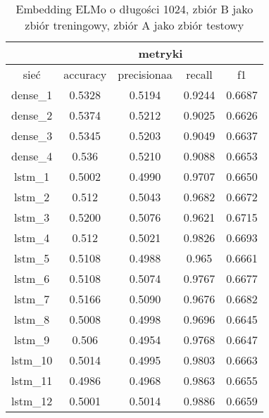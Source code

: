 \begin{table}[] \centering
    \caption{Embedding ELMo o długości 1024, zbiór B jako zbiór treningowy, zbiór A jako zbiór testowy }
    \label{tab:wyniki_1024_eks2}
    \begin{tabular}{|c|c|c|c|c|}
        \hline
                 & \multicolumn{4}{c|}{metryki}                                 \\ \hline
        sieć     & accuracy                     & precisionaa & recall & f1     \\ \hline
        dense\_1 & 0.5328                       & 0.5194      & 0.9244 & 0.6687 \\ \hline
        dense\_2 & 0.5374                       & 0.5212      & 0.9025 & 0.6626 \\ \hline
        dense\_3 & 0.5345                       & 0.5203      & 0.9049 & 0.6637 \\ \hline
        dense\_4 & 0.536                        & 0.5210      & 0.9088 & 0.6653 \\ \hline
        lstm\_1  & 0.5002                       & 0.4990      & 0.9707 & 0.6650 \\ \hline
        lstm\_2  & 0.512                        & 0.5043      & 0.9682 & 0.6672 \\ \hline
        lstm\_3  & 0.5200                       & 0.5076      & 0.9621 & 0.6715 \\ \hline
        lstm\_4  & 0.512                        & 0.5021      & 0.9826 & 0.6693 \\ \hline
        lstm\_5  & 0.5108                       & 0.4988      & 0.965  & 0.6661 \\ \hline
        lstm\_6  & 0.5108                       & 0.5074      & 0.9767 & 0.6677 \\ \hline
        lstm\_7  & 0.5166                       & 0.5090      & 0.9676 & 0.6682 \\ \hline
        lstm\_8  & 0.5008                       & 0.4998      & 0.9696 & 0.6645 \\ \hline
        lstm\_9  & 0.506                        & 0.4954      & 0.9768 & 0.6647 \\ \hline
        lstm\_10 & 0.5014                       & 0.4995      & 0.9803 & 0.6663 \\ \hline
        lstm\_11 & 0.4986                       & 0.4968      & 0.9863 & 0.6655 \\ \hline
        lstm\_12 & 0.5001                       & 0.5014      & 0.9886 & 0.6659 \\ \hline

\end{tabular}
\end{table}
